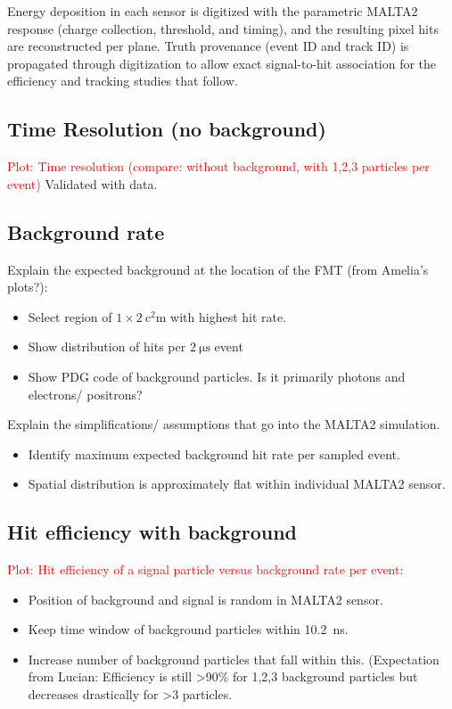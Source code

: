 Energy deposition in each sensor is digitized with the parametric MALTA2
response (charge collection, threshold, and timing), and the resulting
pixel hits are reconstructed per plane. Truth provenance
(event ID and track ID) is propagated through digitization to allow exact
signal-to-hit association for the efficiency and tracking studies that
follow.

\subsection{Time Resolution (no background)}
\textcolor{red}{Plot: Time resolution (compare: without background, with 1,2,3 particles per event)}
Validated with data.

\subsection{Background rate}
Explain the expected background at the location of the FMT (from Amelia's plots?):
\begin{itemize}
    \item Select region of $1\times\SI{2}{\square\centi\meter}$ with highest hit rate.
    \item Show distribution of hits per $\SI{2}{\micro\second}$ event
    \item Show PDG code of background particles. Is it primarily photons and electrons/ positrons?
\end{itemize}

Explain the simplifications/ assumptions that go into the MALTA2 simulation.
\begin{itemize}
    \item Identify maximum expected background hit rate per sampled event.
    \item Spatial distribution is approximately flat within individual MALTA2 sensor.
\end{itemize}

\subsection{Hit efficiency with background}
\textcolor{red}{Plot: Hit efficiency of a signal particle versus background rate per event:}
\begin{itemize}
    \item Position of background and signal is random in MALTA2 sensor.
    \item Keep time window of background particles within \SI{10.2}{\nano\second}.
    \item Increase number of background particles that fall within this. (Expectation from Lucian: Efficiency is still >90\% for 1,2,3 background particles but decreases drastically for >3 particles.
\end{itemize}



